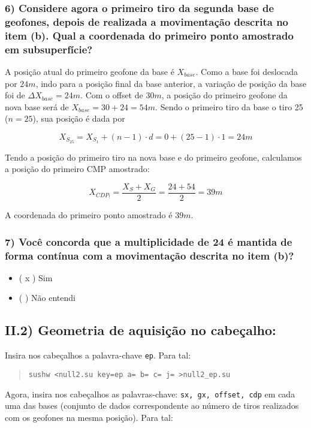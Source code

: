 \documentclass[12pt,a4paper]{article}
\begin{document}
\subsubsection{6) Considere agora o primeiro tiro da segunda base de geofones, depois de realizada a movimentação descrita no item (b). Qual a coordenada do primeiro ponto amostrado em subsuperfície?}

A posição atual do primeiro geofone da base é $X_{base}$. Como a base foi deslocada por $24m$, indo para a posição final da base anterior, a variação de posição da base foi de $\Delta X_{base} = 24m $. Com o offset de $30m$, a posição do primeiro geofone da nova base será de $X_{base} = 30 + 24 = 54m$. Sendo o primeiro tiro da base o tiro 25 ($n = 25$), sua posição é dada por 

$$X_{S_{25}} = X_{S_1} + (n-1)\cdot d = 0 + (25-1)\cdot1 = 24m $$

Tendo a posição do primeiro tiro na nova base e do primeiro geofone, calculamos a posição do primeiro CMP amostrado:

$$ X_{CDP_!} = \frac{X_S + X_G}{2} = \frac{24 + 54}{2} = 39m$$

A coordenada do primeiro ponto amostrado é $39m$. 





\subsubsection{7) Você concorda que a multiplicidade de 24 é mantida de forma contínua com a movimentação descrita no item (b)?}
    \begin{itemize}[leftmargin=1cm]
        \item ( x ) Sim
        \item ( ) Não entendi
    \end{itemize}

\subsection{II.2) Geometria de aquisição no cabeçalho:}

Insira nos cabeçalhos a palavra-chave \texttt{ep}. Para tal:
\begin{quote}
    \texttt{sushw <null2.su key=ep a= b= c= j= >null2\_ep.su}
\end{quote}

Agora, insira nos cabeçalhos as palavras-chave: \texttt{sx, gx, offset, cdp} em cada uma das bases (conjunto de dados correspondente ao número de tiros realizados com os geofones na mesma posição). Para tal:
\end{document}
